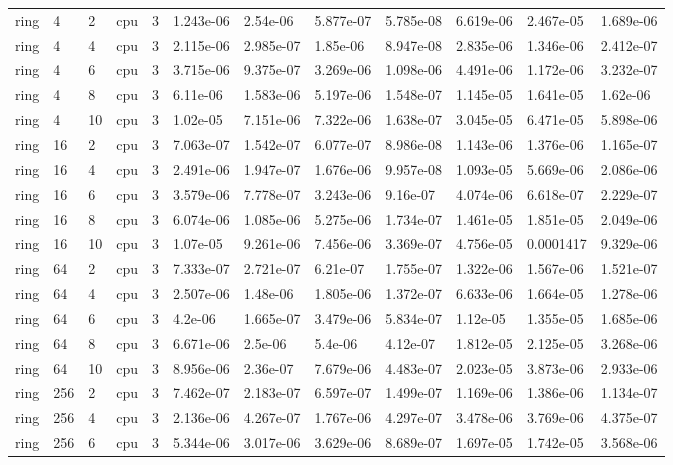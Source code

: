 \begin{tabular}{llllllllllll}
ring & 4 & 2 & cpu & 3 & 1.243e-06 & 2.54e-06 & 5.877e-07 & 5.785e-08 & 6.619e-06 & 2.467e-05 & 1.689e-06 \\
ring & 4 & 4 & cpu & 3 & 2.115e-06 & 2.985e-07 & 1.85e-06 & 8.947e-08 & 2.835e-06 & 1.346e-06 & 2.412e-07 \\
ring & 4 & 6 & cpu & 3 & 3.715e-06 & 9.375e-07 & 3.269e-06 & 1.098e-06 & 4.491e-06 & 1.172e-06 & 3.232e-07 \\
ring & 4 & 8 & cpu & 3 & 6.11e-06 & 1.583e-06 & 5.197e-06 & 1.548e-07 & 1.145e-05 & 1.641e-05 & 1.62e-06 \\
ring & 4 & 10 & cpu & 3 & 1.02e-05 & 7.151e-06 & 7.322e-06 & 1.638e-07 & 3.045e-05 & 6.471e-05 & 5.898e-06 \\
ring & 16 & 2 & cpu & 3 & 7.063e-07 & 1.542e-07 & 6.077e-07 & 8.986e-08 & 1.143e-06 & 1.376e-06 & 1.165e-07 \\
ring & 16 & 4 & cpu & 3 & 2.491e-06 & 1.947e-07 & 1.676e-06 & 9.957e-08 & 1.093e-05 & 5.669e-06 & 2.086e-06 \\
ring & 16 & 6 & cpu & 3 & 3.579e-06 & 7.778e-07 & 3.243e-06 & 9.16e-07 & 4.074e-06 & 6.618e-07 & 2.229e-07 \\
ring & 16 & 8 & cpu & 3 & 6.074e-06 & 1.085e-06 & 5.275e-06 & 1.734e-07 & 1.461e-05 & 1.851e-05 & 2.049e-06 \\
ring & 16 & 10 & cpu & 3 & 1.07e-05 & 9.261e-06 & 7.456e-06 & 3.369e-07 & 4.756e-05 & 0.0001417 & 9.329e-06 \\
ring & 64 & 2 & cpu & 3 & 7.333e-07 & 2.721e-07 & 6.21e-07 & 1.755e-07 & 1.322e-06 & 1.567e-06 & 1.521e-07 \\
ring & 64 & 4 & cpu & 3 & 2.507e-06 & 1.48e-06 & 1.805e-06 & 1.372e-07 & 6.633e-06 & 1.664e-05 & 1.278e-06 \\
ring & 64 & 6 & cpu & 3 & 4.2e-06 & 1.665e-07 & 3.479e-06 & 5.834e-07 & 1.12e-05 & 1.355e-05 & 1.685e-06 \\
ring & 64 & 8 & cpu & 3 & 6.671e-06 & 2.5e-06 & 5.4e-06 & 4.12e-07 & 1.812e-05 & 2.125e-05 & 3.268e-06 \\
ring & 64 & 10 & cpu & 3 & 8.956e-06 & 2.36e-07 & 7.679e-06 & 4.483e-07 & 2.023e-05 & 3.873e-06 & 2.933e-06 \\
ring & 256 & 2 & cpu & 3 & 7.462e-07 & 2.183e-07 & 6.597e-07 & 1.499e-07 & 1.169e-06 & 1.386e-06 & 1.134e-07 \\
ring & 256 & 4 & cpu & 3 & 2.136e-06 & 4.267e-07 & 1.767e-06 & 4.297e-07 & 3.478e-06 & 3.769e-06 & 4.375e-07 \\
ring & 256 & 6 & cpu & 3 & 5.344e-06 & 3.017e-06 & 3.629e-06 & 8.689e-07 & 1.697e-05 & 1.742e-05 & 3.568e-06 \\

\end{tabular}

